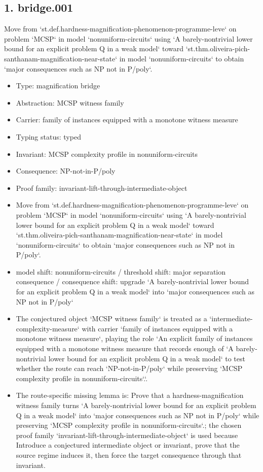 \documentclass[11pt]{article}
\begin{document}
\subsection*{1. bridge.001}
Move from `st.def.hardness-magnification-phenomenon-programme-leve` on problem `MCSP` in model `nonuniform-circuits` using `A barely-nontrivial lower bound for an explicit problem Q in a weak model` toward `st.thm.oliveira-pich-santhanam-magnification-near-state` in model `nonuniform-circuits` to obtain `major consequences such as NP not in P/poly`.
\begin{itemize}
\item Type: magnification bridge
\item Abstraction: MCSP witness family
\item Carrier: family of instances equipped with a monotone witness measure
\item Typing status: typed
\item Invariant: MCSP complexity profile in nonuniform-circuits
\item Consequence: NP-not-in-P/poly
\item Proof family: invariant-lift-through-intermediate-object
\item Move from `st.def.hardness-magnification-phenomenon-programme-leve` on problem `MCSP` in model `nonuniform-circuits` using `A barely-nontrivial lower bound for an explicit problem Q in a weak model` toward `st.thm.oliveira-pich-santhanam-magnification-near-state` in model `nonuniform-circuits` to obtain `major consequences such as NP not in P/poly`.
\item model shift: nonuniform-circuits / threshold shift: major separation consequence / consequence shift: upgrade `A barely-nontrivial lower bound for an explicit problem Q in a weak model` into `major consequences such as NP not in P/poly`
\item The conjectured object `MCSP witness family` is treated as a `intermediate-complexity-measure` with carrier `family of instances equipped with a monotone witness measure`, playing the role `An explicit family of instances equipped with a monotone witness measure that records enough of `A barely-nontrivial lower bound for an explicit problem Q in a weak model` to test whether the route can reach `NP-not-in-P/poly` while preserving `MCSP complexity profile in nonuniform-circuits`.`.
\item The route-specific missing lemma is: Prove that a hardness-magnification witness family turns `A barely-nontrivial lower bound for an explicit problem Q in a weak model` into `major consequences such as NP not in P/poly` while preserving `MCSP complexity profile in nonuniform-circuits`.; the chosen proof family `invariant-lift-through-intermediate-object` is used because Introduce a conjectured intermediate object or invariant, prove that the source regime induces it, then force the target consequence through that invariant.

\end{itemize}
\end{document}
